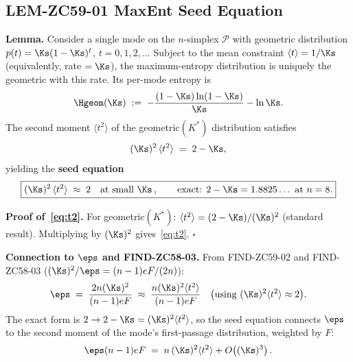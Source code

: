 \documentclass[12pt, a4paper]{article}
\begin{document}
\subsection{LEM-ZC59-01 \quad MaxEnt Seed Equation}
\label{sec:lem01}


\begin{formalbox}[title={LEM-ZC59-01: Single-Mode MaxEnt Seed
  Equation from $n$-Simplex ($R_0$)}]
\textbf{Lemma.}
Consider a single mode on the $n$-simplex $\mathcal{P}$ with
geometric distribution $p(t) = \Ks(1-\Ks)^t$, $t = 0,1,2,\ldots$
Subject to the mean constraint $\langle t\rangle = 1/\Ks$
(equivalently, rate $= \Ks$), the maximum-entropy distribution is
uniquely the geometric with this rate.  Its per-mode entropy is
\begin{equation}\label{eq:Hgeom}
  \Hgeom(\Ks)
  \;:=\; -\frac{(1-\Ks)\ln(1-\Ks)}{\Ks} - \ln\Ks.
\end{equation}
The second moment $\langle t^2\rangle$ of the geometric$(K^*)$
distribution satisfies
\begin{equation}\label{eq:t2}
  (\Ks)^2\,\langle t^2\rangle \;=\; 2 - \Ks,
\end{equation}
yielding the \textbf{seed equation}
\begin{equation}\label{eq:seed}
  \boxed{(\Ks)^2\,\langle t^2\rangle \;\approx\; 2
  \quad \text{at small }\Ks\,,\qquad
  \text{exact: } 2 - \Ks = 1.8825\ldots \text{ at }n=8.}
\end{equation}

\textbf{Proof of~\eqref{eq:t2}.}
For geometric$(K^*)$: $\langle t^2\rangle = (2-\Ks)/(\Ks)^2$
(standard result).
Multiplying by $(\Ks)^2$ gives~\eqref{eq:t2}. \hfill$\square$

\textbf{Connection to $\eps$ and FIND-ZC58-03.}
From FIND-ZC59-02 and FIND-ZC58-03 ($(\Ks)^2/\eps = (n-1)eF/(2n)$):
\begin{equation}\label{eq:eps-from-seed}
  \eps
  \;=\; \frac{2n(\Ks)^2}{(n-1)eF}
  \;\approx\; \frac{n(\Ks)^2\langle t^2\rangle}{(n-1)eF}
  \quad \bigl(\text{using }(\Ks)^2\langle t^2\rangle \approx 2\bigr).
\end{equation}
The exact form is $2 \to 2-\Ks = (\Ks)^2\langle t^2\rangle$,
so the seed equation connects $\eps$ to the second moment of the
mode's first-passage distribution, weighted by $F$:
\[
  \eps(n-1)eF
  \;=\; n\,(\Ks)^2\langle t^2\rangle + O\!\left((\Ks)^3\right).
\]


\end{formalbox}
\end{document}
